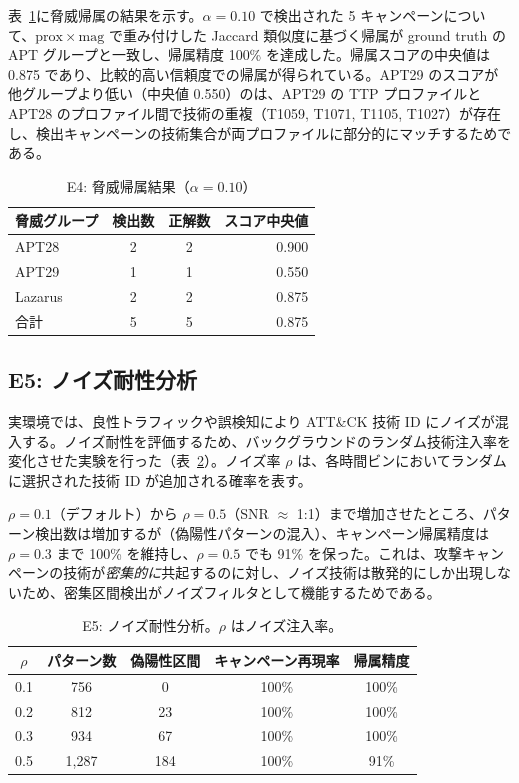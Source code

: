 \documentclass[11pt]{article}
\begin{document}
表~\ref{tab:e4}に脅威帰属の結果を示す。$\alpha = 0.10$ で検出された 5 キャンペーンについて、$\mathrm{prox} \times \mathrm{mag}$ で重み付けした Jaccard 類似度に基づく帰属が ground truth の APT グループと一致し、帰属精度 100\% を達成した。帰属スコアの中央値は 0.875 であり、比較的高い信頼度での帰属が得られている。APT29 のスコアが他グループより低い（中央値 0.550）のは、APT29 の TTP プロファイルと APT28 のプロファイル間で技術の重複（T1059, T1071, T1105, T1027）が存在し、検出キャンペーンの技術集合が両プロファイルに部分的にマッチするためである。

\begin{table}[t]
\centering
\caption{E4: 脅威帰属結果（$\alpha = 0.10$）}
\label{tab:e4}
\begin{tabular}{lccr}
\toprule
脅威グループ & 検出数 & 正解数 & スコア中央値 \\
\midrule
APT28 & 2 & 2 & 0.900 \\
APT29 & 1 & 1 & 0.550 \\
Lazarus & 2 & 2 & 0.875 \\
\midrule
合計 & 5 & 5 & 0.875 \\
\bottomrule
\end{tabular}
\end{table}

\subsection{E5: ノイズ耐性分析}\label{sec:e5}

実環境では、良性トラフィックや誤検知により ATT\&CK 技術 ID にノイズが混入する。ノイズ耐性を評価するため、バックグラウンドのランダム技術注入率を変化させた実験を行った（表~\ref{tab:e5}）。ノイズ率 $\rho$ は、各時間ビンにおいてランダムに選択された技術 ID が追加される確率を表す。

$\rho = 0.1$（デフォルト）から $\rho = 0.5$（SNR $\approx$ 1:1）まで増加させたところ、パターン検出数は増加するが（偽陽性パターンの混入）、キャンペーン帰属精度は $\rho = 0.3$ まで 100\% を維持し、$\rho = 0.5$ でも 91\% を保った。これは、攻撃キャンペーンの技術が\emph{密集的に}共起するのに対し、ノイズ技術は散発的にしか出現しないため、密集区間検出がノイズフィルタとして機能するためである。

\begin{table}[t]
\centering
\caption{E5: ノイズ耐性分析。$\rho$ はノイズ注入率。}
\label{tab:e5}
\begin{tabular}{ccccc}
\toprule
$\rho$ & パターン数 & 偽陽性区間 & キャンペーン再現率 & 帰属精度 \\
\midrule
0.1 & 756 & 0 & 100\% & 100\% \\
0.2 & 812 & 23 & 100\% & 100\% \\
0.3 & 934 & 67 & 100\% & 100\% \\
0.5 & 1{,}287 & 184 & 100\% & 91\% \\
\bottomrule
\end{tabular}
\end{table}
\end{document}
